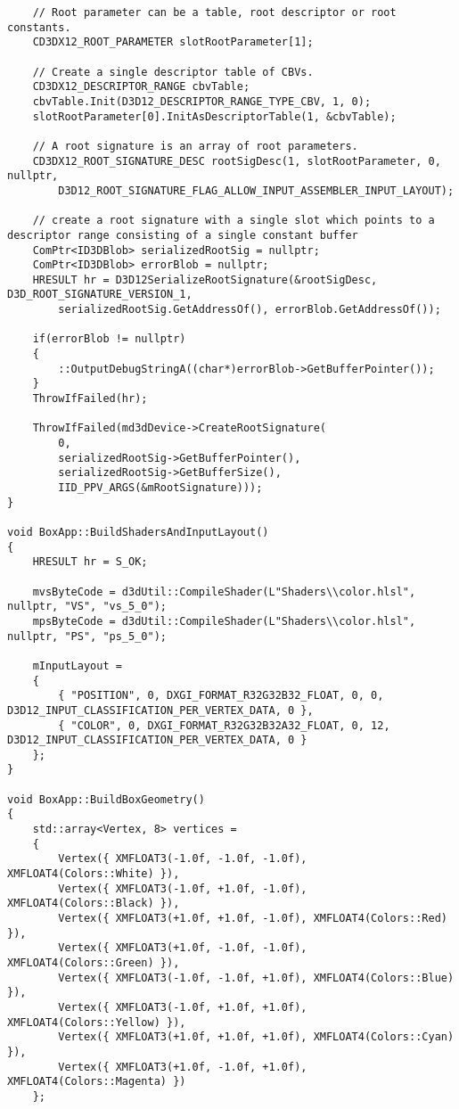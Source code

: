 \begin{lstlisting}
    // Root parameter can be a table, root descriptor or root constants.
    CD3DX12_ROOT_PARAMETER slotRootParameter[1];

    // Create a single descriptor table of CBVs.
    CD3DX12_DESCRIPTOR_RANGE cbvTable;
    cbvTable.Init(D3D12_DESCRIPTOR_RANGE_TYPE_CBV, 1, 0);
    slotRootParameter[0].InitAsDescriptorTable(1, &cbvTable);

    // A root signature is an array of root parameters.
    CD3DX12_ROOT_SIGNATURE_DESC rootSigDesc(1, slotRootParameter, 0, nullptr, 
        D3D12_ROOT_SIGNATURE_FLAG_ALLOW_INPUT_ASSEMBLER_INPUT_LAYOUT);

    // create a root signature with a single slot which points to a descriptor range consisting of a single constant buffer
    ComPtr<ID3DBlob> serializedRootSig = nullptr;
    ComPtr<ID3DBlob> errorBlob = nullptr;
    HRESULT hr = D3D12SerializeRootSignature(&rootSigDesc, D3D_ROOT_SIGNATURE_VERSION_1,
        serializedRootSig.GetAddressOf(), errorBlob.GetAddressOf());

    if(errorBlob != nullptr)
    {
        ::OutputDebugStringA((char*)errorBlob->GetBufferPointer());
    }
    ThrowIfFailed(hr);

    ThrowIfFailed(md3dDevice->CreateRootSignature(
        0,
        serializedRootSig->GetBufferPointer(),
        serializedRootSig->GetBufferSize(),
        IID_PPV_ARGS(&mRootSignature)));
}

void BoxApp::BuildShadersAndInputLayout()
{
    HRESULT hr = S_OK;
    
    mvsByteCode = d3dUtil::CompileShader(L"Shaders\\color.hlsl", nullptr, "VS", "vs_5_0");
    mpsByteCode = d3dUtil::CompileShader(L"Shaders\\color.hlsl", nullptr, "PS", "ps_5_0");

    mInputLayout =
    {
        { "POSITION", 0, DXGI_FORMAT_R32G32B32_FLOAT, 0, 0, D3D12_INPUT_CLASSIFICATION_PER_VERTEX_DATA, 0 },
        { "COLOR", 0, DXGI_FORMAT_R32G32B32A32_FLOAT, 0, 12, D3D12_INPUT_CLASSIFICATION_PER_VERTEX_DATA, 0 }
    };
}

void BoxApp::BuildBoxGeometry()
{
    std::array<Vertex, 8> vertices =
    {
        Vertex({ XMFLOAT3(-1.0f, -1.0f, -1.0f), XMFLOAT4(Colors::White) }),
        Vertex({ XMFLOAT3(-1.0f, +1.0f, -1.0f), XMFLOAT4(Colors::Black) }),
        Vertex({ XMFLOAT3(+1.0f, +1.0f, -1.0f), XMFLOAT4(Colors::Red) }),
        Vertex({ XMFLOAT3(+1.0f, -1.0f, -1.0f), XMFLOAT4(Colors::Green) }),
        Vertex({ XMFLOAT3(-1.0f, -1.0f, +1.0f), XMFLOAT4(Colors::Blue) }),
        Vertex({ XMFLOAT3(-1.0f, +1.0f, +1.0f), XMFLOAT4(Colors::Yellow) }),
        Vertex({ XMFLOAT3(+1.0f, +1.0f, +1.0f), XMFLOAT4(Colors::Cyan) }),
        Vertex({ XMFLOAT3(+1.0f, -1.0f, +1.0f), XMFLOAT4(Colors::Magenta) })
    };


\end{lstlisting}
